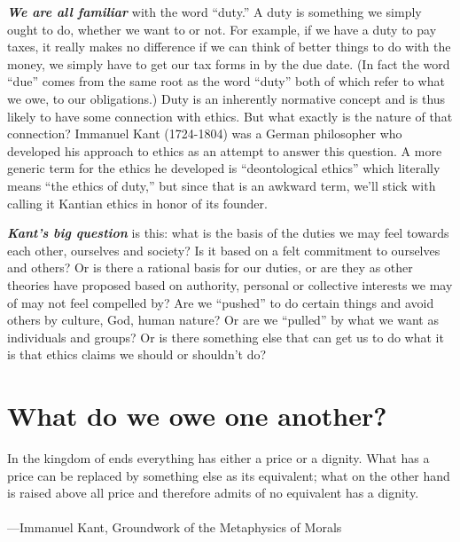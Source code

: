 \documentclass[12pt, openany]{book}
\newenvironment{epigraph}%
{
\begin{flushright}
\begin{minipage}{30em}
\begin{flushright}
\itshape
}%
{
\end{flushright}
\end{minipage}
\end{flushright}
\vspace{1em}
}
\begin{document}
\textbf{\emph{We are all familiar}} with the word ``duty.'' A duty is something we simply ought to do, whether we want to or not. For example, if we have a duty to pay taxes, it really makes no difference if we can think of better things to do with the money, we simply have to get our tax forms in by the due date. (In fact the word ``due'' comes from the same root as the word ``duty'' both of which refer to what we owe, to our obligations.) Duty is an inherently normative concept and is thus likely to have some connection with ethics. But what exactly is the nature of that connection? Immanuel Kant (1724-1804) was a German philosopher who developed his approach to ethics as an attempt to answer this question. A more generic term for the ethics he developed is ``deontological ethics'' which literally means ``the ethics of duty,'' but since that is an awkward term, we'll stick with calling it Kantian ethics in honor of its founder.

\textbf{\emph{Kant's big question}} is this: what is the basis of the duties we may feel towards each other, ourselves and society? Is it based on a felt commitment to ourselves and others? Or is there a rational basis for our duties, or are they as other theories have proposed based on authority, personal or collective interests we may of may not feel compelled by? Are we ``pushed'' to do certain things and avoid others by culture, God, human nature? Or are we ``pulled'' by what we want as individuals and groups? Or is there something else that can get us to do what it is that ethics claims we should or shouldn't do?

\hypertarget{what-do-we-owe-one-another}{%
\section{What do we owe one another?}\label{what-do-we-owe-one-another}}

\begin{epigraph}

In the kingdom of ends everything has either a price or a dignity. What has a price can be replaced by something else as its equivalent; what on the other hand is raised above all price and therefore admits of no equivalent has a dignity.\\
~\\
---Immanuel Kant, Groundwork of the Metaphysics of Morals

\end{epigraph}
\end{document}
